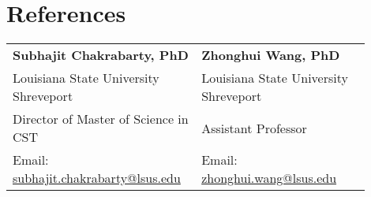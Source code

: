 \documentclass[letterpaper,11pt]{article}
\begin{document}
\section{References}

    \begin{tabular}{@{}p{0.45\linewidth}p{0.45\linewidth}@{}}
                \textbf{Subhajit Chakrabarty, PhD} & \textbf{Zhonghui Wang, PhD} \\
                Louisiana State University Shreveport & Louisiana State University Shreveport \\
                Director of Master of Science in CST & Assistant Professor \\
                Email: \href{mailto:subhajit.chakrabarty@lsus.edu}{subhajit.chakrabarty@lsus.edu} & Email: \href{mailto:zhonghui.wang@lsus.edu}{zhonghui.wang@lsus.edu}
    \end{tabular}
\end{document}
